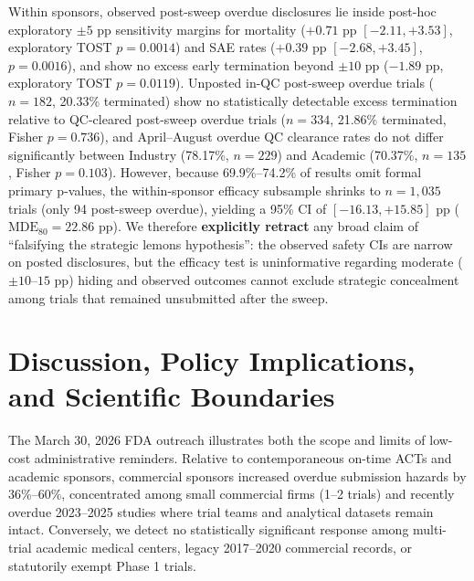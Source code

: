 \documentclass[11pt,letterpaper]{article}
\begin{document}
Within sponsors, observed post-sweep overdue disclosures lie inside post-hoc exploratory $\pm 5$ pp sensitivity margins for mortality ($+0.71$ pp $[-2.11, +3.53]$, exploratory TOST $p=0.0014$) and SAE rates ($+0.39$ pp $[-2.68, +3.45]$, $p=0.0016$), and show no excess early termination beyond $\pm 10$ pp ($-1.89$ pp, exploratory TOST $p=0.0119$). Unposted in-QC post-sweep overdue trials ($n=182$, 20.33\% terminated) show no statistically detectable excess termination relative to QC-cleared post-sweep overdue trials ($n=334$, 21.86\% terminated, Fisher $p=0.736$), and April--August overdue QC clearance rates do not differ significantly between Industry (78.17\%, $n=229$) and Academic (70.37\%, $n=135$, Fisher $p=0.103$). However, because 69.9\%--74.2\% of results omit formal primary p-values, the within-sponsor efficacy subsample shrinks to $n=1,035$ trials (only 94 post-sweep overdue), yielding a 95\% CI of $[-16.13, +15.85]$ pp ($\mathrm{MDE}_{80}=22.86$ pp). We therefore \textbf{explicitly retract} any broad claim of ``falsifying the strategic lemons hypothesis'': the observed safety CIs are narrow on posted disclosures, but the efficacy test is uninformative regarding moderate ($\pm 10$--$15$ pp) hiding and observed outcomes cannot exclude strategic concealment among trials that remained unsubmitted after the sweep.

\section{Discussion, Policy Implications, and Scientific Boundaries}
The March 30, 2026 FDA outreach illustrates both the scope and limits of low-cost administrative reminders. Relative to contemporaneous on-time ACTs and academic sponsors, commercial sponsors increased overdue submission hazards by 36\%--60\%, concentrated among small commercial firms (1--2 trials) and recently overdue 2023--2025 studies where trial teams and analytical datasets remain intact. Conversely, we detect no statistically significant response among multi-trial academic medical centers, legacy 2017--2020 commercial records, or statutorily exempt Phase 1 trials.
\end{document}

